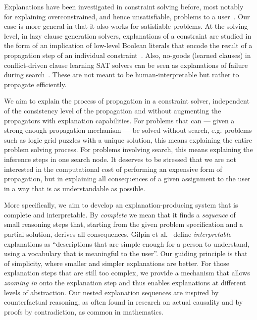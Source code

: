 Explanations have been investigated in constraint solving before, most notably for explaining overconstrained, and hence unsatisfiable, problems to a user~\cite{junker2001quickxplain}.
Our case is more general in that it also works for satisfiable problems.
At the solving level, in lazy clause generation solvers, explanations of a constraint are studied in the form of an implication of low-level Boolean literals that encode the result of a propagation step of an individual constraint~\cite{feydy2009lazy}. 
Also, no-goods (learned clauses) in conflict-driven clause learning SAT solvers can be seen as explanations of failure during search~\cite{marques2009conflict}. 
These are not meant to be human-interpretable but rather to propagate efficiently.

We aim to explain the process of propagation in a constraint solver, independent of the consistency level of the propagation and without augmenting the propagators with explanation capabilities.
For problems that can --- given a strong enough propagation mechanism --- be solved without search, e.g. problems such as logic grid puzzles with a unique solution, this means explaining the entire problem solving process. 
For problems involving search, this means explaining the inference steps  in one search node. 
It deserves to be stressed that we are not interested in the computational cost of performing an expensive form of propagation, but in explaining all consequences of a given assignment to the user in a way that is as understandable as possible. 

More specifically, we aim to develop an explanation-producing system that is complete and interpretable. 
By \textit{complete} we mean that it finds a \textit{sequence} of small reasoning steps that, starting from the given problem specification and a partial solution, derives all consequences. 
Gilpin et al.~\cite{DBLP:conf/dsaa/GilpinBYBSK18} define \textit{interpretable} explanations as ``descriptions that are simple enough for a person to understand, using a vocabulary that is meaningful to the user''. 
Our guiding principle is that of simplicity, where smaller and simpler explanations are better. 
For those explanation steps that are still too complex, we provide a mechanism that allows \emph{zooming in} onto the explanation step and thus enables explanations at different levels of abstraction. Our nested explanation sequences are inspired by counterfactual reasoning, as often found in research on actual causality and by proofs by contradiction, as common in mathematics.

